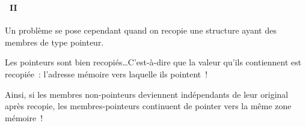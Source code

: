 \begin{frame}%
  \frametitle{\secname}
  \framesubtitle{\subsecname~II}

  Un problème se pose cependant quand on recopie une structure ayant des membres de type pointeur.
  \vspace{0.5cm}
  \par
  Les pointeurs sont bien recopiés\ldots C'est-à-dire que la valeur qu'ils contiennent est recopiée~: l'adresse mémoire vers laquelle ils
  pointent~!
  \par
  Ainsi, si les membres non-pointeurs deviennent indépendants de leur original après recopie, les membres-pointeurs continuent de
  pointer vers la même zone mémoire~!
\end{frame}

